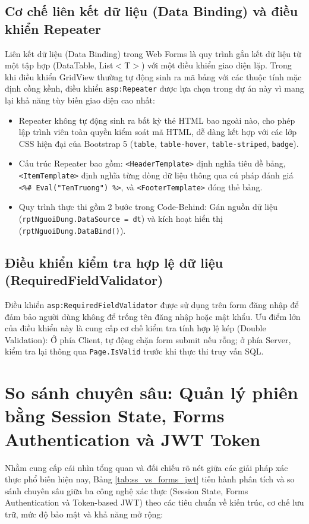 \documentclass[12pt,a4paper]{report}
\begin{document}
\subsection{Cơ chế liên kết dữ liệu (Data Binding) và điều khiển Repeater}
Liên kết dữ liệu (Data Binding) trong Web Forms là quy trình gắn kết dữ liệu từ một tập hợp (DataTable, List$<$T$>$) với một điều khiển giao diện lặp. Trong khi điều khiển GridView thường tự động sinh ra mã bảng với các thuộc tính mặc định cồng kềnh, điều khiển \texttt{asp:Repeater} được lựa chọn trong dự án này vì mang lại khả năng tùy biến giao diện cao nhất:
\begin{itemize}
    \item Repeater không tự động sinh ra bất kỳ thẻ HTML bao ngoài nào, cho phép lập trình viên toàn quyền kiểm soát mã HTML, dễ dàng kết hợp với các lớp CSS hiện đại của Bootstrap 5 (\texttt{table}, \texttt{table-hover}, \texttt{table-striped}, \texttt{badge}).
    \item Cấu trúc Repeater bao gồm: \texttt{<HeaderTemplate>} định nghĩa tiêu đề bảng, \texttt{<ItemTemplate>} định nghĩa từng dòng dữ liệu thông qua cú pháp đánh giá \texttt{<\%\# Eval("TenTruong") \%>}, và \texttt{<FooterTemplate>} đóng thẻ bảng.
    \item Quy trình thực thi gồm 2 bước trong Code-Behind: Gán nguồn dữ liệu (\texttt{rptNguoiDung.DataSource = dt}) và kích hoạt hiển thị (\texttt{rptNguoiDung.DataBind()}).
\end{itemize}

\subsection{Điều khiển kiểm tra hợp lệ dữ liệu (RequiredFieldValidator)}
Điều khiển \texttt{asp:RequiredFieldValidator} được sử dụng trên form đăng nhập để đảm bảo người dùng không để trống tên đăng nhập hoặc mật khẩu. Ưu điểm lớn của điều khiển này là cung cấp cơ chế kiểm tra tính hợp lệ kép (Double Validation): Ở phía Client, tự động chặn form submit nếu rỗng; ở phía Server, kiểm tra lại thông qua \texttt{Page.IsValid} trước khi thực thi truy vấn SQL.

\section{So sánh chuyên sâu: Quản lý phiên bằng Session State, Forms Authentication và JWT Token}
Nhằm cung cấp cái nhìn tổng quan và đối chiếu rõ nét giữa các giải pháp xác thực phổ biến hiện nay, Bảng \ref{tab:ss_vs_forms_jwt} tiến hành phân tích và so sánh chuyên sâu giữa ba công nghệ xác thực (Session State, Forms Authentication và Token-based JWT) theo các tiêu chuẩn về kiến trúc, cơ chế lưu trữ, mức độ bảo mật và khả năng mở rộng:
\end{document}
